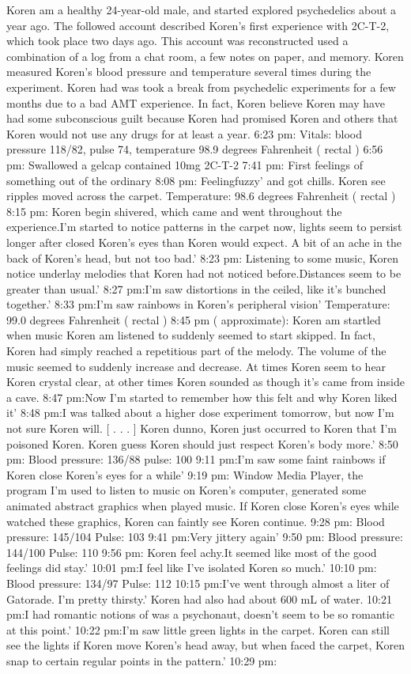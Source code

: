 \documentclass[12pt]{book}
\begin{document}
Koren am a healthy 24-year-old male, and started explored psychedelics about a year ago. The followed account described Koren's first experience with 2C-T-2, which took place two days ago. This account was reconstructed used a combination of a log from a chat room, a few notes on paper, and memory. Koren measured Koren's blood pressure and temperature several times during the experiment. Koren had was took a break from psychedelic experiments for a few months due to a bad AMT experience. In fact, Koren believe Koren may have had some subconscious guilt because Koren had promised Koren and others that Koren would not use any drugs for at least a year. 6:23 pm: Vitals: blood pressure 118/82, pulse 74, temperature 98.9 degrees Fahrenheit ( rectal ) 6:56 pm: Swallowed a gelcap contained 10mg 2C-T-2 7:41 pm: First feelings of something out of the ordinary 8:08 pm: Feelingfuzzy' and got chills. Koren see ripples moved across the carpet. Temperature: 98.6 degrees Fahrenheit ( rectal ) 8:15 pm: Koren begin shivered, which came and went throughout the experience.I'm started to notice patterns in the carpet now, lights seem to persist longer after closed Koren's eyes than Koren would expect. A bit of an ache in the back of Koren's head, but not too bad.' 8:23 pm: Listening to some music, Koren notice underlay melodies that Koren had not noticed before.Distances seem to be greater than usual.' 8:27 pm:I'm saw distortions in the ceiled, like it's bunched together.' 8:33 pm:I'm saw rainbows in Koren's peripheral vision' Temperature: 99.0 degrees Fahrenheit ( rectal ) 8:45 pm ( approximate): Koren am startled when music Koren am listened to suddenly seemed to start skipped. In fact, Koren had simply reached a repetitious part of the melody. The volume of the music seemed to suddenly increase and decrease. At times Koren seem to hear Koren crystal clear, at other times Koren sounded as though it's came from inside a cave. 8:47 pm:Now I'm started to remember how this felt and why Koren liked it' 8:48 pm:I was talked about a higher dose experiment tomorrow, but now I'm not sure Koren will. [ . . .  ] Koren dunno, Koren just occurred to Koren that I'm poisoned Koren. Koren guess Koren should just respect Koren's body more.' 8:50 pm: Blood pressure: 136/88 pulse: 100 9:11 pm:I'm saw some faint rainbows if Koren close Koren's eyes for a while' 9:19 pm: Window Media Player, the program I'm used to listen to music on Koren's computer, generated some animated abstract graphics when played music. If Koren close Koren's eyes while watched these graphics, Koren can faintly see Koren continue. 9:28 pm: Blood pressure: 145/104 Pulse: 103 9:41 pm:Very jittery again' 9:50 pm: Blood pressure: 144/100 Pulse: 110 9:56 pm: Koren feel achy.It seemed like most of the good feelings did stay.' 10:01 pm:I feel like I've isolated Koren so much.' 10:10 pm: Blood pressure: 134/97 Pulse: 112 10:15 pm:I've went through almost a liter of Gatorade. I'm pretty thirsty.' Koren had also had about 600 mL of water. 10:21 pm:I had romantic notions of was a psychonaut, doesn't seem to be so romantic at this point.' 10:22 pm:I'm saw little green lights in the carpet. Koren can still see the lights if Koren move Koren's head away, but when faced the carpet, Koren snap to certain regular points in the pattern.' 10:29 pm: 
\end{document}
